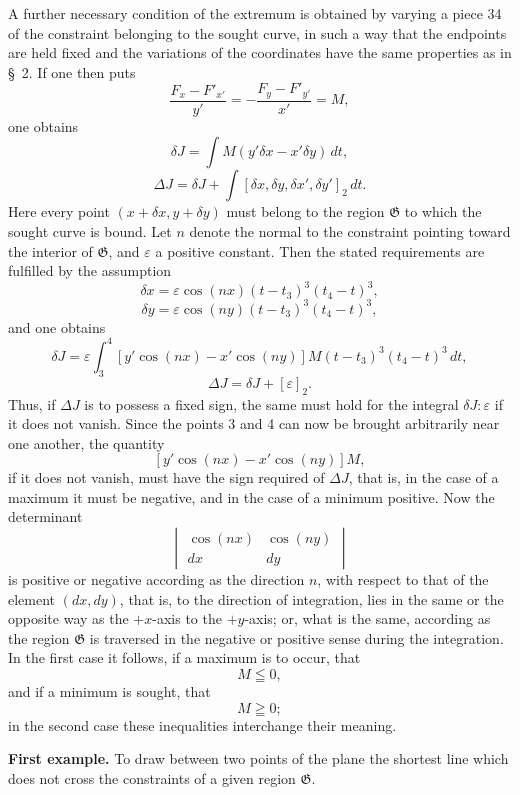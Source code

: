 \documentclass[11pt,a4paper,leqno]{article}
\begin{document}
A further necessary condition of the extremum is obtained by varying a piece 34 of the constraint belonging to the sought curve, in such a way that the endpoints are held fixed and the variations of the coordinates have the same properties as in \S~2. If one then puts
\[
\frac{F_x-F'_{x'}}{y'}=-\frac{F_y-F'_{y'}}{x'}=M,
\]
one obtains
\[
\delta J=\int M(y'\delta x-x'\delta y)\,dt,
\]
\[
\Delta J=\delta J+\int[\delta x,\delta y,\delta x',\delta y']_2\,dt.
\]
Here every point $(x+\delta x,y+\delta y)$ must belong to the region $\mathfrak{G}$ to which the sought curve is bound. Let $n$ denote the normal to the constraint pointing toward the interior of $\mathfrak{G}$, and $\varepsilon$ a positive constant. Then the stated requirements are fulfilled by the assumption
\[
\delta x=\varepsilon\cos(nx)(t-t_3)^3(t_4-t)^3,
\]
\[
\delta y=\varepsilon\cos(ny)(t-t_3)^3(t_4-t)^3,
\]
and one obtains
\[
\delta J=\varepsilon\int_3^4 [y'\cos(nx)-x'\cos(ny)]M(t-t_3)^3(t_4-t)^3\,dt,
\]
\[
\Delta J=\delta J+[\varepsilon]_2.
\]
Thus, if $\Delta J$ is to possess a fixed sign, the same must hold for the integral $\delta J:\varepsilon$ if it does not vanish. Since the points 3 and 4 can now be brought arbitrarily near one another, the quantity
\[
[y'\cos(nx)-x'\cos(ny)]M,
\]
if it does not vanish, must have the sign required of $\Delta J$, that is, in the case of a maximum it must be negative, and in the case of a minimum positive. Now the determinant
\[
\begin{vmatrix}
\cos(nx)&\cos(ny)\\
dx&dy
\end{vmatrix}
\]
is positive or negative according as the direction $n$, with respect to that of the element $(dx,dy)$, that is, to the direction of integration, lies in the same or the
opposite way as the $+x$-axis to the $+y$-axis; or, what is the same, according as the region $\mathfrak{G}$ is traversed in the negative or positive sense during the integration. In the first case it follows, if a maximum is to occur, that
\[
M\leqq 0,
\]
and if a minimum is sought, that
\[
M\geqq 0;
\]
in the second case these inequalities interchange their meaning.

\textbf{First example.} To draw between two points of the plane the shortest line which does not cross the constraints of a given region $\mathfrak{G}$.
\end{document}
